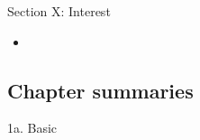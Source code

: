 \begin{ASM_chapter}
Section X: Interest 
\begin{itemize}[leftmargin = *]
	\item	{}
\end{itemize}
\end{ASM_chapter}

\subsection{Chapter summaries}

\begin{CHPT_SUMM_AUTO}[label = {L.-1a}]{1a. Basic}

\end{CHPT_SUMM_AUTO}
